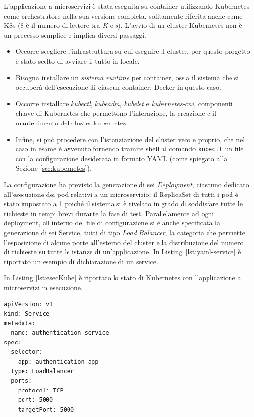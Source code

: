 	\medskip
	L'applicazione a microservizi è stata eseguita su container utilizzando Kubernetes come orchestratore nella sua versione completa, solitamente riferita anche come K8s (8 è il numero di lettere tra \emph{K} e \emph{s}).
	L'avvio di un cluster Kubernetes non è un processo semplice e implica diversi passaggi.
	
	\begin{itemize}	
		\item Occorre scegliere l'infrastruttura su cui eseguire il cluster, per questo progetto è stato scelto di avviare il tutto in locale.
		
		\item Bisogna installare un \emph{sistema runtime} per container, ossia il sistema che si occuperà dell'esecuzione di ciascun container;
		Docker in questo caso.
		
		\item Occorre installare \emph{kubectl}, \emph{kubeadm}, \emph{kubelet} e \emph{kubernetes-cni}, componenti chiave di Kubernetes che permettono l'interazione, la creazione e il mantenimento del cluster kubernetes.
		
		\item Infine, si può procedere con l'istanziazione del cluster vero e proprio, che nel caso in esame è avvenuto fornendo tramite shell al comando \texttt{kubectl} un file con la configurazione desiderata in formato YAML (come spiegato alla Sezione \ref{sec:kubernetes}).
	\end{itemize}
	
	La configurazione ha previsto la generazione di sei \emph{Deployment}, ciascuno dedicato all'esecuzione dei pod relativi a un microservizio;
	il ReplicaSet di tutti i pod è stato impostato a 1 poiché il sistema si è rivelato in grado di soddisfare tutte le richieste in tempi brevi durante la fase di test.
	Parallelamente ad ogni deployment, all'interno del file di configurazione si è anche specificata la generazione di sei Service, tutti di tipo \emph{Load Balancer}, la categoria che permette l'esposizione di alcune porte all'esterno del cluster e la distribuzione del numero di richieste su tutte le istanze di un'applicazione.
	In Listing~\ref{lst:yaml-service} è riportato un esempio di dichiarazione di un service.
	
	In Listing \ref{lst:esecKube} è riportato lo stato di Kubernetes con l'applicazione a microservizi in esecuzione.

	\begin{listing}[tb]
	\begin{verbatim}
apiVersion: v1
kind: Service
metadata:
  name: authentication-service
spec:
  selector:
    app: authentication-app
  type: LoadBalancer
  ports:
  - protocol: TCP
    port: 5000
    targetPort: 5000
	\end{verbatim}
	\caption{Dichiarazione del service per il deployment Authentication}
	\label{lst:yaml-service}
	\end{listing}
	
